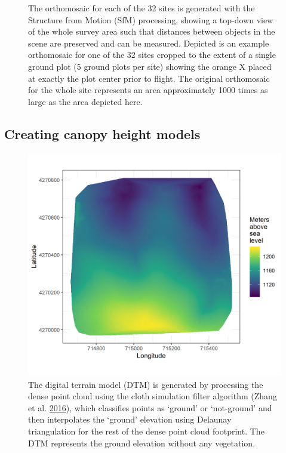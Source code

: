 \documentclass[twoside,12pt,final]{ucthesis-CA2012}
\begin{document}
\begin{ucmainmatter}
\begin{figure}
\caption{The orthomosaic for each of the 32 sites is generated with the
Structure from Motion (SfM) processing, showing a top-down view of the
whole survey area such that distances between objects in the scene are
preserved and can be measured. Depicted is an example orthomosaic for
one of the 32 sites cropped to the extent of a single ground plot (5
ground plots per site) showing the orange X placed at exactly the plot
center prior to flight. The original orthomosaic for the whole site
represents an area approximately 1000 times as large as the area
depicted here.}
\end{figure}
\subsection{Creating canopy height
models}\label{creating-canopy-height-models}
\begin{figure}
\centering
\includegraphics[width=6.00000in]{figure/chap02/eldo_3k_3_dtm.png}
\caption{The digital terrain model (DTM) is generated by processing the
dense point cloud using the cloth simulation filter algorithm (Zhang et
al. \protect\hyperlink{ref-zhang2016}{2016}), which classifies points as
`ground' or `not-ground' and then interpolates the `ground' elevation
using Delaunay triangulation for the rest of the dense point cloud
footprint. The DTM represents the ground elevation without any
vegetation.}
\end{figure}
\begin{figure}

\end{figure}
\end{ucmainmatter}
\end{document}

